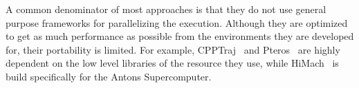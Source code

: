 



A common denominator of most approaches is that they do not use general purpose
frameworks for parallelizing the execution. Although they are optimized to get
as much performance as possible from the environments they are developed for,
their portability is limited. For example, CPPTraj~\cite{roe2018parallelization}
and Pteros~\cite{yesylevskyy2015pteros} are highly dependent on the low level
libraries of the resource they use, while HiMach~\cite{tiankai2008scalable} is
build specifically for the Antons Supercomputer.


